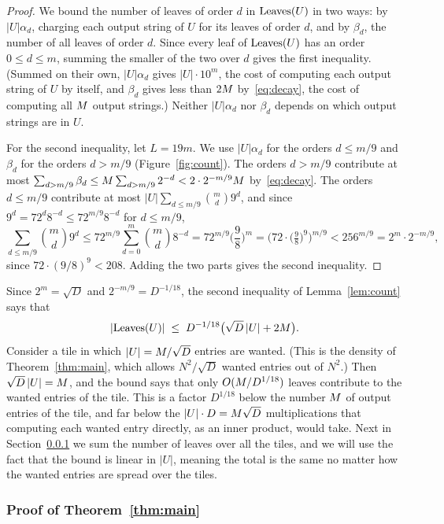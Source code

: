 \begin{proof}
We bound the number of leaves of order $d$ in $\mathrm{Leaves}(U)$ in two ways: by $|U|\alpha_d$, charging each output string of $U$ for its leaves of order $d$, and by $\beta_d$, the number of all leaves of order $d$. Since every leaf of $\mathrm{Leaves}(U)$ has an order $0\le d\le m$, summing the smaller of the two over $d$ gives the first inequality. (Summed on their own, $|U|\alpha_d$ gives $|U|\cdot10^m$, the cost of computing each output string of $U$ by itself, and $\beta_d$ gives less than $2M$ by~\eqref{eq:decay}, the cost of computing all $M$ output strings.) Neither $|U|\alpha_d$ nor $\beta_d$ depends on which output strings are in $U$.

For the second inequality, let $L=19m$. We use $|U|\alpha_d$ for the orders $d\le m/9$ and $\beta_d$ for the orders $d>m/9$ (Figure~\ref{fig:count}). The orders $d>m/9$ contribute at most $\sum_{d>m/9}\beta_d\le M\sum_{d>m/9}2^{-d}<2\cdot2^{-m/9}M$ by~\eqref{eq:decay}. The orders $d\le m/9$ contribute at most $|U|\sum_{d\le m/9}\binom md9^d$, and since $9^d=72^d8^{-d}\le72^{m/9}8^{-d}$ for $d\le m/9$,
\[
\sum_{d\le m/9}\binom md9^d\le72^{m/9}\sum_{d=0}^{m}\binom md8^{-d}=72^{m/9}\Big(\frac98\Big)^m=\Big(72\cdot\big(\tfrac98\big)^9\Big)^{m/9}<256^{m/9}=2^m\cdot2^{-m/9},
\]
since $72\cdot(9/8)^9<208$. Adding the two parts gives the second inequality.
\end{proof}

Since $2^m=\sqrt D$ and $2^{-m/9}=D^{-1/18}$, the second inequality of Lemma~\ref{lem:count} says that
\[
|\mathrm{Leaves}(U)|\;\le\;D^{-1/18}\big(\sqrt D\,|U|+2M\big).
\]
Consider a tile in which $|U|=M/\sqrt D$ entries are wanted. (This is the density of Theorem~\ref{thm:main}, which allows $N^2/\sqrt D$ wanted entries out of $N^2$.) Then $\sqrt D\,|U|=M$, and the bound says that only $O(M/D^{1/18})$ leaves contribute to the wanted entries of the tile. This is a factor $D^{1/18}$ below the number $M$ of output entries of the tile, and far below the $|U|\cdot D=M\sqrt D$ multiplications that computing each wanted entry directly, as an inner product, would take. Next in Section~\ref{sec:proof} we sum the number of leaves over all the tiles, and we will use the fact that the bound is linear in $|U|$, meaning the total is the same no matter how the wanted entries are spread over the tiles.

\subsubsection{Proof of Theorem~\ref{thm:main}}\label{sec:proof}

